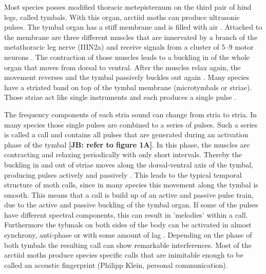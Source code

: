 \documentclass[12pt,a4paper]{article}
\newcommand{\note}[2][]{\textbf{[#1: #2]}}
\newcommand{\notejb}[1]{\note[JB]{#1}}
\begin{document}
Most species posses modified thoracic metepisternum on the third  pair of hind legs, called tymbals. With this organ, arctiid moths can produce ultrasonic pulses. The tymbal organ has a stiff membrane and is filled with air \cite{blest1963, fullard1977, fullard1990}. Attached to the membrane are three different muscles that are innervated by a branch of the metathoracic leg nerve (IIIN2a) and receive signals from a cluster of 5--9 motor neurons \cite{nuesch1957, fullard1992}. The contraction of those muscles leads to a buckling in of the whole organ that moves from dorsal to ventral. After the muscles relax again, the movement reverses and the tymbal passively buckles out again \cite{blest1963}. Many species have a striated band on top of the tymbal membrane (microtymbals or striae). Those striae act like single instruments and each produces a single pulse \cite{blest1963, fullard1977, fullard1990, weller1999}.

The frequency components of each stria sound can change from stria to stria. In many species those single pulses are combined to a series of pulses. Such a series is called a call and contains all pulses that are generated during an activation phase of the tymbal \notejb{refer to figure 1A}. In this phase, the muscles are contracting and relaxing periodically with only short intervals. Thereby the buckling in and out of striae moves along the dorsal-ventral axis of the tymbal, producing pulses actively and passively \cite{corcoran2010}. This leads to the typical temporal structure of moth calls, since in many species this movement along the tymbal is smooth. This means that a call is build up of an active and passive pulse train, due to the active and passive buckling of the tymbal organ. If some of the pulses have different spectral components, this can result in 'melodies' within a call. Furthermore the tybmals on both sides of the body can be activated in almost synchrony, anti-phase or with some amount of lag \cite{fullard1977}. Depending on the phase of both tymbals the resulting call can show remarkable interferences. Most of the arctiid moths produce species specific calls that are inimitable enough to be called an acoustic fingerprint (Philipp Klein, personal communication). 
\end{document}
